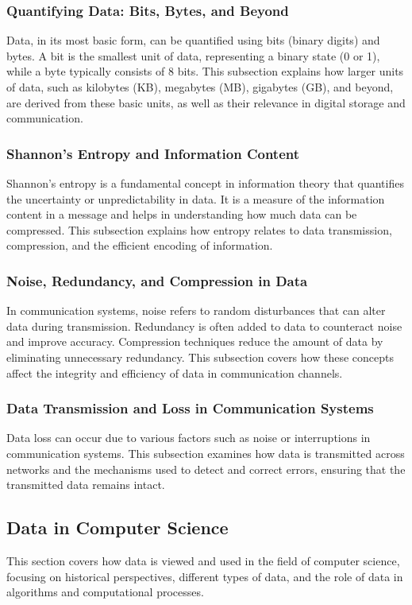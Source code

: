 \documentclass[12pt, oneside]{book}
\begin{document}
\subsubsection{Quantifying Data: Bits, Bytes, and Beyond}
Data, in its most basic form, can be quantified using bits (binary digits) and bytes. A bit is the smallest unit of data, representing a binary state (0 or 1), while a byte typically consists of 8 bits. This subsection explains how larger units of data, such as kilobytes (KB), megabytes (MB), gigabytes (GB), and beyond, are derived from these basic units, as well as their relevance in digital storage and communication.

\subsubsection{Shannon's Entropy and Information Content}
Shannon's entropy is a fundamental concept in information theory that quantifies the uncertainty or unpredictability in data. It is a measure of the information content in a message and helps in understanding how much data can be compressed. This subsection explains how entropy relates to data transmission, compression, and the efficient encoding of information.

\subsubsection{Noise, Redundancy, and Compression in Data}
In communication systems, noise refers to random disturbances that can alter data during transmission. Redundancy is often added to data to counteract noise and improve accuracy. Compression techniques reduce the amount of data by eliminating unnecessary redundancy. This subsection covers how these concepts affect the integrity and efficiency of data in communication channels.

\subsubsection{Data Transmission and Loss in Communication Systems}
Data loss can occur due to various factors such as noise or interruptions in communication systems. This subsection examines how data is transmitted across networks and the mechanisms used to detect and correct errors, ensuring that the transmitted data remains intact.

\subsection{Data in Computer Science}
This section covers how data is viewed and used in the field of computer science, focusing on historical perspectives, different types of data, and the role of data in algorithms and computational processes.
\end{document}
